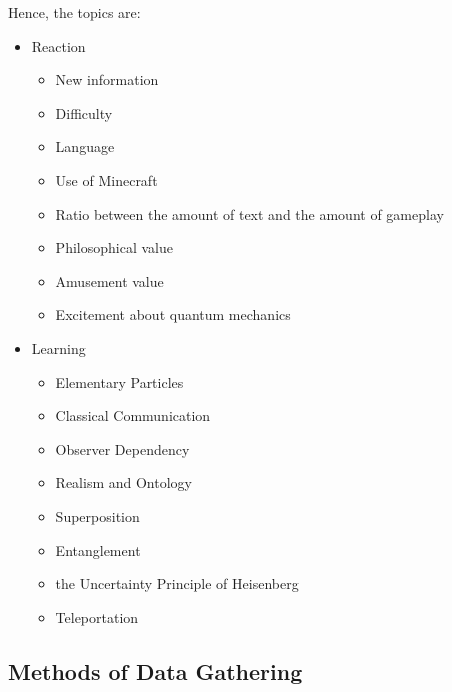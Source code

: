 \documentclass[11pt,twoside]{report} %
\begin{document}
Hence, the topics are:
\begin{itemize}
	\item Reaction
	\begin{itemize}
		\item New information
		\item Difficulty
		\item Language
		\item Use of Minecraft
		\item Ratio between the amount of text and the amount of gameplay
		\item Philosophical value
		\item Amusement value
		\item Excitement about quantum mechanics
	\end{itemize}
	\item Learning
	\begin{itemize}
		\item Elementary Particles
		\item Classical Communication
		\item Observer Dependency
		\item Realism and Ontology
		\item Superposition
		\item Entanglement
		\item the Uncertainty Principle of Heisenberg
		\item Teleportation
	\end{itemize}
\end{itemize}

\subsection{Methods of Data Gathering}
\end{document}
